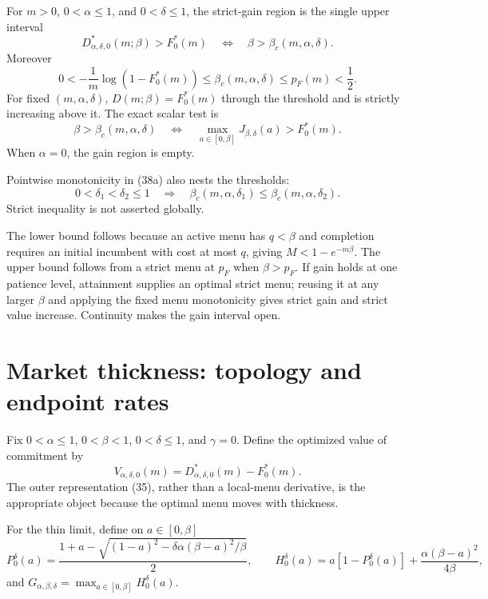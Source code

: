 \documentclass[mnsc,dblanonrev]{informs4}
\begin{document}
\begin{theorem}
\label{thm:patience}
For $m>0$, $0<\alpha\le1$, and $0<\delta\le1$, the strict-gain region is the single upper
interval
\[
 D_{\alpha,\delta,0}^*(m;\beta)>F_0^*(m)
 \quad\Longleftrightarrow\quad
 \beta>\beta_c(m,\alpha,\delta).                           \tag{40}
\]
Moreover
\[
 0< -\frac1m\log(1-F_0^*(m))
 \le\beta_c(m,\alpha,\delta)\le p_F(m)<\frac12.           \tag{41}
\]
For fixed $(m,\alpha,\delta)$, $D(m;\beta)=F_0^*(m)$ through the threshold and is
strictly increasing above it.  The exact scalar test is
\[
 \beta>\beta_c(m,\alpha,\delta)
 \quad\Longleftrightarrow\quad
 \max_{a\in[0,\beta]}J_{\beta,\delta}(a)>F_0^*(m).        \tag{42}
\]
When $\alpha=0$, the gain region is empty.
\end{theorem}

Pointwise monotonicity in (38a) also nests the thresholds:
\[
 0<\delta_1<\delta_2\le1
 \quad\Longrightarrow\quad
 \beta_c(m,\alpha,\delta_1)
 \le\beta_c(m,\alpha,\delta_2).                            \tag{42a}
\]
Strict inequality is not asserted globally.

The lower bound follows because an active menu has $q<\beta$ and completion
requires an initial incumbent with cost at most $q$, giving
$M<1-e^{-m\beta}$.  The upper bound follows from a strict menu at $p_F$ when
$\beta>p_F$.  If gain holds at one patience level, attainment supplies an
optimal strict menu; reusing it at any larger $\beta$ and applying the fixed
menu monotonicity gives strict gain and strict value increase.  Continuity
makes the gain interval open.

\section{Market thickness: topology and endpoint rates}
\label{sec:thickness}

Fix $0<\alpha\le1$, $0<\beta<1$, $0<\delta\le1$, and $\gamma=0$.  Define
the optimized value of commitment by
\[
 V_{\alpha,\delta,0}(m)
 =D_{\alpha,\delta,0}^*(m)-F_0^*(m).                       \tag{43}
\]
The outer representation (35), rather than a local-menu derivative, is the
appropriate object because the optimal menu moves with thickness.

For the thin limit, define on $a\in[0,\beta]$
\[
 P_0^\delta(a)=
 \frac{1+a-\sqrt{(1-a)^2-
 \delta\alpha(\beta-a)^2/\beta}}2,
 \qquad
 H_0^\delta(a)=a[1-P_0^\delta(a)]
 +\frac{\alpha(\beta-a)^2}{4\beta},                       \tag{44}
\]
and $G_{\alpha,\beta,\delta}=\max_{a\in[0,\beta]}H_0^\delta(a)$.
\end{document}
